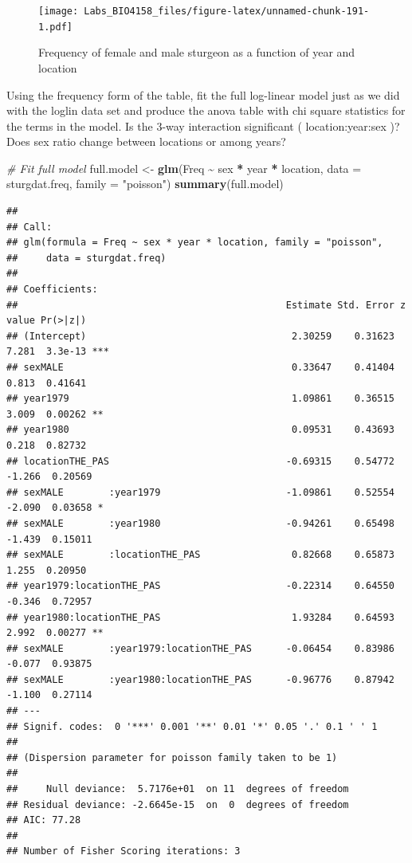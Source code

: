 \documentclass[
  12pt,
]{book}
\makeatletter
\newenvironment{Shaded}{\begin{snugshade}}{\end{snugshade}}
\newcommand{\CommentTok}[1]{\textcolor[rgb]{0.56,0.35,0.01}{\textit{#1}}}
\newcommand{\DataTypeTok}[1]{\textcolor[rgb]{0.13,0.29,0.53}{#1}}
\newcommand{\KeywordTok}[1]{\textcolor[rgb]{0.13,0.29,0.53}{\textbf{#1}}}
\newcommand{\NormalTok}[1]{#1}
\newcommand{\OperatorTok}[1]{\textcolor[rgb]{0.81,0.36,0.00}{\textbf{#1}}}
\newcommand{\StringTok}[1]{\textcolor[rgb]{0.31,0.60,0.02}{#1}}
\newenvironment{kframe}{%
\medskip{}
\setlength{\fboxsep}{.8em}
\def\at@end@of@kframe{}%
\ifinner\ifhmode%
 \def\at@end@of@kframe{\end{minipage}}%
 \begin{minipage}{\columnwidth}%
\fi\fi%
\def\FrameCommand##1{\hskip\@totalleftmargin \hskip-\fboxsep
\colorbox{incolor}{##1}\hskip-\fboxsep
    \hskip-\linewidth \hskip-\@totalleftmargin \hskip\columnwidth}%
\MakeFramed {\advance\hsize-\width
  \@totalleftmargin\z@ \linewidth\hsize
  \@setminipage}}%
{\par\unskip\endMakeFramed%
\at@end@of@kframe}
\newenvironment{rmdblock}[1]
 {
 \begin{itemize}
 \renewcommand{\labelitemi}{
   \raisebox{-.7\height}[0pt][0pt]{
     {\setkeys{Gin}{width=3em,keepaspectratio}\texttt{[image: images/\#1]}}
   }
 }
 \begin{kframe}
 \setlength{\fboxsep}{1em}
 \item
 }
 {
 \end{kframe}
 \end{itemize}
 }
\newenvironment{rmdcode}
  {\begin{rmdblock}{screen}}
  {\end{rmdblock}}
\makeatother
\begin{document}
\begin{figure}
\centering
\texttt{[image: Labs\_BIO4158\_files/figure-latex/unnamed-chunk-191-1.pdf]}
\caption{\label{fig:unnamed-chunk-191}Frequency of female and male sturgeon as a function of year and location}
\end{figure}

\begin{rmdcode}
Using the frequency form of the table, fit the full log-linear model just as we did with the loglin data set and produce the anova table with chi square statistics for the terms in the model. Is the 3-way interaction significant ( location:year:sex )? Does sex ratio change between locations or among years?
\end{rmdcode}

\begin{Shaded}
\begin{Highlighting}[]
\CommentTok{\# Fit full model}
\NormalTok{full.model \textless{}{-}}\StringTok{ }\KeywordTok{glm}\NormalTok{(Freq }\OperatorTok{\textasciitilde{}}\StringTok{ }\NormalTok{sex }\OperatorTok{*}\StringTok{ }\NormalTok{year }\OperatorTok{*}\StringTok{ }\NormalTok{location, }\DataTypeTok{data =}\NormalTok{ sturgdat.freq, }\DataTypeTok{family =} \StringTok{"poisson"}\NormalTok{)}
\KeywordTok{summary}\NormalTok{(full.model)}
\end{Highlighting}
\end{Shaded}

\begin{verbatim}
## 
## Call:
## glm(formula = Freq ~ sex * year * location, family = "poisson", 
##     data = sturgdat.freq)
## 
## Coefficients:
##                                               Estimate Std. Error z value Pr(>|z|)    
## (Intercept)                                    2.30259    0.31623   7.281  3.3e-13 ***
## sexMALE                                        0.33647    0.41404   0.813  0.41641    
## year1979                                       1.09861    0.36515   3.009  0.00262 ** 
## year1980                                       0.09531    0.43693   0.218  0.82732    
## locationTHE_PAS                               -0.69315    0.54772  -1.266  0.20569    
## sexMALE        :year1979                      -1.09861    0.52554  -2.090  0.03658 *  
## sexMALE        :year1980                      -0.94261    0.65498  -1.439  0.15011    
## sexMALE        :locationTHE_PAS                0.82668    0.65873   1.255  0.20950    
## year1979:locationTHE_PAS                      -0.22314    0.64550  -0.346  0.72957    
## year1980:locationTHE_PAS                       1.93284    0.64593   2.992  0.00277 ** 
## sexMALE        :year1979:locationTHE_PAS      -0.06454    0.83986  -0.077  0.93875    
## sexMALE        :year1980:locationTHE_PAS      -0.96776    0.87942  -1.100  0.27114    
## ---
## Signif. codes:  0 '***' 0.001 '**' 0.01 '*' 0.05 '.' 0.1 ' ' 1
## 
## (Dispersion parameter for poisson family taken to be 1)
## 
##     Null deviance:  5.7176e+01  on 11  degrees of freedom
## Residual deviance: -2.6645e-15  on  0  degrees of freedom
## AIC: 77.28
## 
## Number of Fisher Scoring iterations: 3
\end{verbatim}
\end{document}
